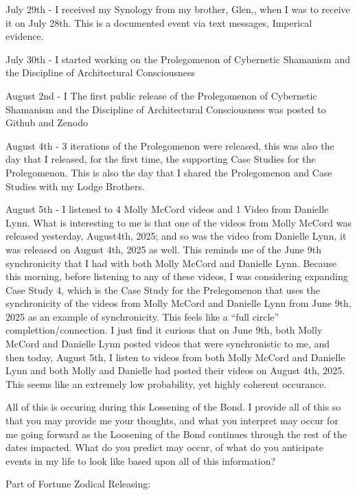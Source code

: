 \documentclass{article}
\begin{document}
July 29th - I received my Synology from my brother, Glen,, when I was to
receive it on July 28th. This is a documented event via text messages,
Imperical evidence.

July 30th - I started working on the Prolegomenon of Cybernetic
Shamanism and the Discipline of Architectural Consciousness

August 2nd - I The first public release of the Prolegomenon of
Cybernetic Shamanism and the Discipline of Architectural Consciousness
was posted to Github and Zenodo

August 4th - 3 iterations of the Prolegomenon were released, this was
also the day that I released, for the first time, the supporting Case
Studies for the Prolegomenon. This is also the day that I shared the
Prolegomenon and Case Studies with my Lodge Brothers.

August 5th - I listened to 4 Molly McCord videos and 1 Video from
Danielle Lynn. What is interesting to me is that one of the videos from
Molly McCord was released yesterday, August4th, 2025; and so was the
video from Danielle Lynn, it was released on August 4th, 2025 as well.
This reminds me of the June 9th synchronicity that I had with both Molly
McCord and Danielle Lynn. Because this morning, before listening to any
of these videos, I was considering expanding Case Study 4, which is the
Case Study for the Prelegomenon that uses the synchronicity of the
videos from Molly McCord and Danielle Lynn from June 9th, 2025 as an
example of synchronicity. This feels like a ``full circle''
complettion/connection. I just find it curious that on June 9th, both
Molly McCord and Danielle Lynn posted videos that were synchronistic to
me, and then today, August 5th, I listen to videos from both Molly
McCord and Danielle Lynn and both Molly and Danielle had posted their
videos on August 4th, 2025. This seems like an extremely low
probability, yet highly coherent occurance.

All of this is occuring during this Lossening of the Bond. I provide all
of this so that you may provide me your thoughts, and what you interpret
may occur for me going forward as the Loosening of the Bond continues
through the rest of the dates impacted. What do you predict may occur,
of what do you anticipate events in my life to look like based upon all
of this information?

Part of Fortune Zodical Releasing:
\end{document}
